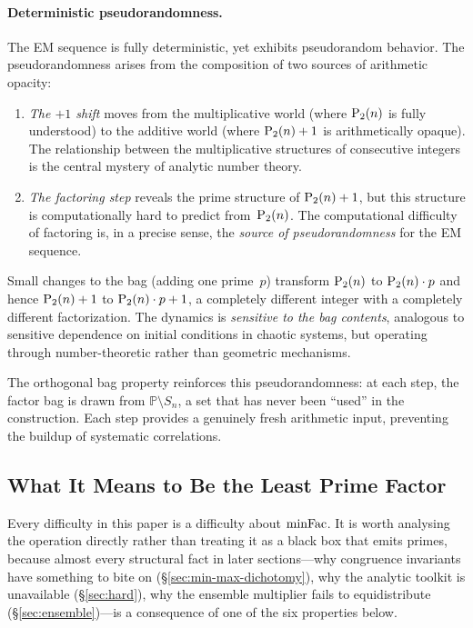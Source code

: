 \paragraph{Deterministic pseudorandomness.}
The EM sequence is fully deterministic, yet exhibits pseudorandom
behavior.  The pseudorandomness arises from the composition of two
sources of arithmetic opacity:
\begin{enumerate}[nosep]
\item \emph{The $+1$ shift} moves from the multiplicative world (where
  $\mathrm{P}_{2}(n)$ is fully understood) to the additive world (where
  $\mathrm{P}_{2}(n)+1$ is arithmetically opaque).  The relationship between the
  multiplicative structures of consecutive integers is the central
  mystery of analytic number theory.
\item \emph{The factoring step} reveals the prime structure of
  $\mathrm{P}_{2}(n)+1$, but this structure is computationally hard to predict
  from~$\mathrm{P}_{2}(n)$.  The computational difficulty of factoring is, in a
  precise sense, the \emph{source of pseudorandomness} for the EM
  sequence.
\end{enumerate}
Small changes to the bag (adding one prime~$p$) transform $\mathrm{P}_{2}(n)$ to
$\mathrm{P}_{2}(n) \cdot p$ and hence $\mathrm{P}_{2}(n)+1$ to $\mathrm{P}_{2}(n) \cdot p + 1$, a
completely different integer with a completely different factorization.
The dynamics is \emph{sensitive to the bag contents}, analogous to
sensitive dependence on initial conditions in chaotic systems, but
operating through number-theoretic rather than geometric mechanisms.

The orthogonal bag property reinforces this pseudorandomness: at each
step, the factor bag is drawn from $\mathbb{P} \setminus S_n$, a set
that has never been ``used'' in the construction.  Each step provides a
genuinely fresh arithmetic input, preventing the buildup of systematic
correlations.

\subsection{What It Means to Be the Least Prime Factor}
\label{sec:minfac}

Every difficulty in this paper is a difficulty about $\mathrm{minFac}$.  It is
worth analysing the operation directly rather than treating it as a
black box that emits primes, because almost every structural fact in
later sections---why congruence invariants have something to bite on
(\S\ref{sec:min-max-dichotomy}), why the analytic toolkit is
unavailable (\S\ref{sec:hard}), why the ensemble multiplier fails to
equidistribute (\S\ref{sec:ensemble})---is a consequence of one of the
six properties below.

